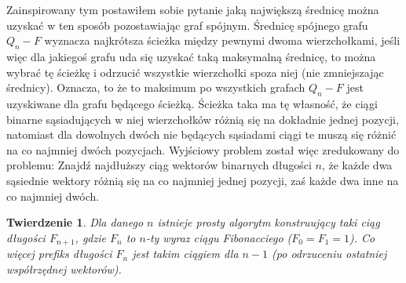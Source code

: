 \documentclass{pracamgr}
\newtheorem{theorem}{Twierdzenie}
\begin{document}
    Zainspirowany tym postawiłem sobie pytanie jaką największą średnicę można uzyskać w ten sposób pozostawiając graf spójnym.
    Średnicę spójnego grafu $Q_n-F$ wyznacza najkrótsza ścieżka między pewnymi dwoma wierzchołkami, jeśli więc dla jakiegoś grafu uda się uzyskać
    taką maksymalną średnicę, to można wybrać tę ścieżkę i odrzucić wszystkie wierzchołki spoza niej (nie zmniejszając średnicy).
    Oznacza, to że to maksimum po wszystkich grafach $Q_n-F$ jest uzyskiwane dla grafu będącego ścieżką.
    Ścieżka taka ma tę własność, że ciągi binarne sąsiadujących w niej wierzchołków różnią się na dokładnie jednej pozycji,
    natomiast dla dowolnych dwóch nie będących sąsiadami ciągi te muszą się różnić na co najmniej dwóch pozycjach.
    Wyjściowy problem został więc zredukowany do problemu:\newline
    Znajdź najdłuższy ciąg wektorów binarnych długości $n$,
    że każde dwa sąsiednie wektory różnią się na co najmniej jednej pozycji, zaś każde dwa inne na co najmniej dwóch. 
    \begin{theorem}\label{co najmniej fibo}
     Dla danego $n$ istnieje prosty algorytm konstruujący taki ciąg długości $F_{n+1}$, gdzie $F_n$ to $n$-ty wyraz ciągu Fibonacciego ($F_0=F_1=1$).
     Co więcej prefiks długości $F_{n}$ jest takim ciągiem dla $n-1$ (po odrzuceniu ostatniej współrzędnej wektorów).
    \end{theorem}
\end{document}
